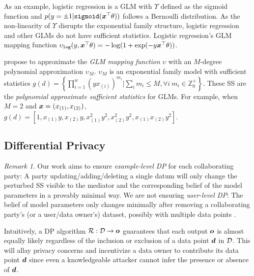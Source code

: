 \documentclass{article}
\theoremstyle{plain}
\theoremstyle{definition}
\theoremstyle{remark}
\renewcommand{\citet}[1]{\cite{#1}}
\begin{document}
As an example, logistic regression is a GLM with $\Upsilon$ defined as the sigmoid function and $ p(y = \pm 1 | \texttt{sigmoid}({\bm{x}}^\top \theta))$ follows a Bernoulli distribution. As the non-linearity of $\Upsilon$ disrupts the exponential family structure, logistic regression and other GLMs do not have sufficient statistics. Logistic regression's GLM mapping function $\upsilon_{\texttt{log}}(y, {\bm{x}}^\top \theta) = -\log(1+\exp({- y {\bm{x}}^\top \theta}))$.

\citet{huggins2017pass} propose to approximate the \emph{GLM mapping function} $\upsilon$ with an $M$-degree polynomial approximation $\upsilon_M$. $\upsilon_M$ is an exponential family model with sufficient statistics $g(d) = \left\{ \prod_{i=1}^w (yx_{(i)})^{m_i} | \sum_i m_i \leq M, \forall i\ m_i \in \mathbb{Z}_0^+ \right\}$. These SS are the \emph{polynomial approximate sufficient statistics} for GLMs. For example, when $M=2$ and ${\bm{x}} = (x_{(1)}, x_{(2)})$, $g(d) = \left[ 
1, x_{(1)}y, x_{(2)}y, x_{(1)}^2 y^2, x_{(2)}^2 y^2, x_{(1)}x_{(2)} y^2
\right]$.

\subsection{Differential Privacy}\label{app:sub:dp}

\emph{Remark 1.} Our work aims to ensure \emph{example-level DP} for each collaborating party: A party updating/adding/deleting a single datum will only change the perturbed SS visible to the mediator and the corresponding belief of the model parameters in a provably minimal way. We are not ensuring \emph{user-level DP}:
The belief of model parameters only changes minimally after removing a collaborating party's (or a user/data owner's) dataset, possibly with multiple data points \cite{googleblog}.

Intuitively, a DP algorithm $\mathcal{R}: {\mathcal{D}} \rightarrow {\bm{o}}$ guarantees that each output ${\bm{o}}$ is almost equally likely regardless of the inclusion or exclusion of a data point ${\bm{d}}$ in ${\mathcal{D}}$.
This will allay privacy concerns and incentivize a data owner to contribute its data point ${\bm{d}}$ since even a knowledgeable attacker cannot infer the presence or absence of ${\bm{d}}$.
\end{document}
